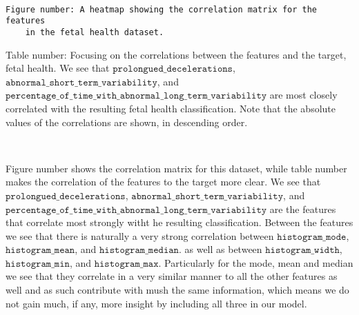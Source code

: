 \documentclass[11pt]{article}
\begin{document}
    \begin{center}
    \end{center}
    { \hspace*{\fill} \\}

 \begin{Verbatim}[commandchars=\\\{\}]
 	Figure number: A heatmap showing the correlation matrix for the features 
 	in the fetal health dataset.
 \end{Verbatim}
 

Table number: Focusing on the correlations between the features and the target, 
fetal health. We see that $\texttt{prolongued\_decelerations}$, 
$\texttt{abnormal\_short\_term\_variability}$, and 
$\texttt{percentage\_of\_time\_with\_abnormal\_long\_term\_variability}$ are most closely 
correlated with the resulting fetal health classification. Note that the absolute 
values of the correlations are shown, in descending order.

    \begin{center}
\end{center}
{ \hspace*{\fill} \\}
        
    Figure number shows the correlation matrix for this dataset, while table
number makes the correlation of the features to the target more clear.
We see that \(\texttt{prolongued\_decelerations}\),
\(\texttt{abnormal\_short\_term\_variability}\), and
\(\texttt{percentage\_of\_time\_with\_abnormal\_long\_term\_variability}\) are
the features that correlate most strongly witht he resulting
classification. Between the features we see that there is naturally a
very strong correlation between \(\texttt{histogram\_mode}\),
\(\texttt{histogram\_mean}\), and \(\texttt{histogram\_median}\). as well
as between \(\texttt{histogram\_width}\), \(\texttt{histogram\_min}\), and
\(\texttt{histogram\_max}\). Particularly for the mode, mean and median
we see that they correlate in a very similar manner to all the other
features as well and as such contribute with mush the same information,
which means we do not gain much, if any, more insight by including all
three in our model.
\end{document}

